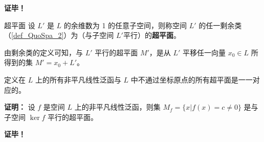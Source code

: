 \textbf{证毕！}

\begin{definition}{超平面}
设 $L'$ 是 $L$ 的余维数为 1 的任意子空间，则称空间 $L'$ 的任一剩余类（\autoref{def_QuoSpa_2}）为（与子空间 $L'$平行）的\textbf{超平面}。
\end{definition}
由剩余类的定义可知，与 $L'$ 平行的超平面 $M'$，是从 $L'$ 平移任一向量 $x_0\in L$ 所得到的集 $M'=x_0+L'$。



\begin{theorem}{}
定义在 $L$ 上的所有非平凡线性泛函与 $L$ 中不通过坐标原点的所有超平面是一一对应的。
\end{theorem}

\textbf{证明：} 设 $f$ 是空间 $L$ 上的非平凡线性泛函，则集 $M_f=\{x|f(x)=c\neq 0\}$ 是与子空间 $\ker f$ 平行的超平面。 


\textbf{证毕！}



